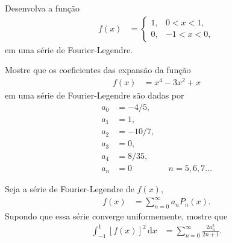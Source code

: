 \documentclass[a4paper,12pt, leqno, answers]{exam}
\begin{document}
\thispagestyle{empty}

\newpage
\setcounter{page}{1}
\begin{questions}
    \question Desenvolva a função
    \begin{align*}
        f(x) &= \begin{cases}
            1, & 0 < x < 1, \\
            0, & -1 < x < 0,
        \end{cases}
    \end{align*}
    em uma série de Fourier-Legendre.
    \begin{solution}
    \end{solution}

    \question Mostre que os coeficientes das expansão da função
    \begin{align*}
        f(x) &= x^4 - 3 x^2 + x
    \end{align*}
    em uma série de Fourier-Legendre são dadas por
    \begin{align*}
        a_0 &= -4/5, \\
        a_1 &= 1, \\
        a_2 &= -10/7, \\
        a_3 &= 0, \\
        a_4 &= 8/35, \\
        a_n &= 0 && n = 5, 6, 7 \ldots
    \end{align*}
    \begin{solution}
    \end{solution}

    \question Seja a série de Fourier-Legendre de $f(x)$,
    \begin{align*}
        f(x) &= \sum_{n = 0}^\infty a_n P_n(x).
    \end{align*}
    Supondo que essa série converge uniformemente, mostre que
    \begin{align*}
        \int_{-1}^1 \left[ f(x) \right]^ 2 \,\mathrm{d}x &= \sum_{n = 0}^\infty \frac{2 a_n^2}{2 n + 1}.
    \end{align*}
    \begin{solution}
    \end{solution}


\end{questions}
\end{document}

